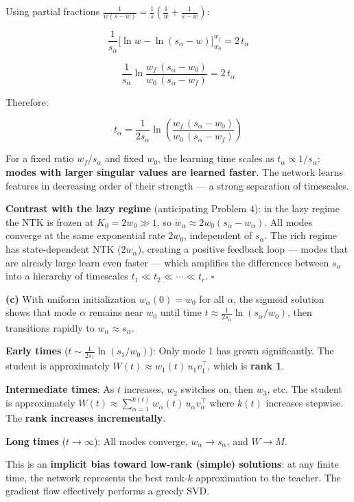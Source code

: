 \documentclass[
]{article}
\begin{document}
Using partial fractions
\(\frac{1}{w(s-w)} = \frac{1}{s}\!\left(\frac{1}{w} + \frac{1}{s-w}\right)\):

\[\frac{1}{s_\alpha}\Big[\ln w - \ln(s_\alpha - w)\Big]_{w_0}^{w_f} = 2\,t_\alpha\]

\[\frac{1}{s_\alpha}\ln\frac{w_f\,(s_\alpha - w_0)}{w_0\,(s_\alpha - w_f)} = 2\,t_\alpha\]

Therefore:

\[\boxed{t_\alpha = \frac{1}{2s_\alpha}\ln\left(\frac{w_f\,(s_\alpha - w_0)}{w_0\,(s_\alpha - w_f)}\right)}\]

For a fixed ratio \(w_f/s_\alpha\) and fixed \(w_0\), the learning time
scales as \(t_\alpha \propto 1/s_\alpha\): \textbf{modes with larger
singular values are learned faster}. The network learns features in
decreasing order of their strength --- a strong separation of
timescales.

\textbf{Contrast with the lazy regime} (anticipating Problem 4): in the
lazy regime the NTK is frozen at \(K_0 = 2w_0 \gg 1\), so
\(\dot{w}_\alpha \approx 2w_0(s_\alpha - w_\alpha)\). All modes converge
at the same exponential rate \(2w_0\), independent of \(s_\alpha\). The
rich regime has state-dependent NTK (\(2w_\alpha\)), creating a positive
feedback loop --- modes that are already large learn even faster ---
which amplifies the differences between \(s_\alpha\) into a hierarchy of
timescales \(t_1 \ll t_2 \ll \cdots \ll t_r\). \(\square\)

\textbf{(c)} With uniform initialization \(w_\alpha(0) = w_0\) for all
\(\alpha\), the sigmoid solution shows that mode \(\alpha\) remains near
\(w_0\) until time \(t \approx \frac{1}{2s_\alpha}\ln(s_\alpha/w_0)\),
then transitions rapidly to \(w_\alpha \approx s_\alpha\).

\textbf{Early times} (\(t \sim \frac{1}{2s_1}\ln(s_1/w_0)\)): Only mode
1 has grown significantly. The student is approximately
\(W(t) \approx w_1(t)\,u_1 v_1^\top\), which is \textbf{rank 1}.

\textbf{Intermediate times}: As \(t\) increases, \(w_2\) switches on,
then \(w_3\), etc. The student is approximately
\(W(t) \approx \sum_{\alpha=1}^{k(t)} w_\alpha(t)\,u_\alpha v_\alpha^\top\)
where \(k(t)\) increases stepwise. The \textbf{rank increases
incrementally}.

\textbf{Long times} (\(t \to \infty\)): All modes converge,
\(w_\alpha \to s_\alpha\), and \(W \to M\).

This is an \textbf{implicit bias toward low-rank (simple) solutions}: at
any finite time, the network represents the best rank-\(k\)
approximation to the teacher. The gradient flow effectively performs a
greedy SVD.
\end{document}
